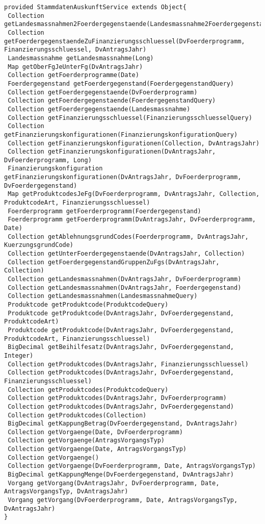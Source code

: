\begin{lstlisting}[style = dsl, caption = Deklaration von StammdatenAuskunftService, captionpos = b, label = lst_std]
provided StammdatenAuskunftService extends Object{
 Collection getLandesmassnahmen2Foerdergegenstaende(Landesmassnahme2FoerdergegenstandQuery)
 Collection getFoerdergegenstaendeZuFinanzierungsschluessel(DvFoerderprogramm, Finanzierungsschluessel, DvAntragsJahr)
 Landesmassnahme getLandesmassnahme(Long)
 Map getOberFgJeUnterFg(DvAntragsJahr)
 Collection getFoerderprogramme(Date)
 Foerdergegenstand getFoerdergegenstand(FoerdergegenstandQuery)
 Collection getFoerdergegenstaende(DvFoerderprogramm)
 Collection getFoerdergegenstaende(FoerdergegenstandQuery)
 Collection getFoerdergegenstaende(Landesmassnahme)
 Collection getFinanzierungsschluessel(FinanzierungsschluesselQuery)
 Collection getFinanzierungskonfigurationen(FinanzierungskonfigurationQuery)
 Collection getFinanzierungskonfigurationen(Collection, DvAntragsJahr)
 Collection getFinanzierungskonfigurationen(DvAntragsJahr, DvFoerderprogramm, Long)
 Finanzierungskonfiguration getFinanzierungskonfigurationen(DvAntragsJahr, DvFoerderprogramm, DvFoerdergegenstand)
 Map getProduktcodesJeFg(DvFoerderprogramm, DvAntragsJahr, Collection, ProduktcodeArt, Finanzierungsschluessel)
 Foerderprogramm getFoerderprogramm(Foerdergegenstand)
 Foerderprogramm getFoerderprogramm(DvAntragsJahr, DvFoerderprogramm, Date)
 Collection getAblehnungsgrundCodes(Foerderprogramm, DvAntragsJahr, KuerzungsgrundCode)
 Collection getUnterFoerdergegenstaende(DvAntragsJahr, Collection)
 Collection getFoerdergegenstandGruppenZuFgs(DvAntragsJahr, Collection)
 Collection getLandesmassnahmen(DvAntragsJahr, DvFoerderprogramm)
 Collection getLandesmassnahmen(DvAntragsJahr, Foerdergegenstand)
 Collection getLandesmassnahmen(LandesmassnahmeQuery)
 Produktcode getProduktcode(ProduktcodeQuery)
 Produktcode getProduktcode(DvAntragsJahr, DvFoerdergegenstand, ProduktcodeArt)
 Produktcode getProduktcode(DvAntragsJahr, DvFoerdergegenstand, ProduktcodeArt, Finanzierungsschluessel)
 BigDecimal getBeihilfesatz(DvAntragsJahr, DvFoerdergegenstand, Integer)
 Collection getProduktcodes(DvAntragsJahr, Finanzierungsschluessel)
 Collection getProduktcodes(DvAntragsJahr, DvFoerdergegenstand, Finanzierungsschluessel)
 Collection getProduktcodes(ProduktcodeQuery)
 Collection getProduktcodes(DvAntragsJahr, DvFoerderprogramm)
 Collection getProduktcodes(DvAntragsJahr, DvFoerdergegenstand)
 Collection getProduktcodes(Collection)
 BigDecimal getKappungBetrag(DvFoerdergegenstand, DvAntragsJahr)
 Collection getVorgaenge(Date, DvFoerderprogramm)
 Collection getVorgaenge(AntragsVorgangsTyp)
 Collection getVorgaenge(Date, AntragsVorgangsTyp)
 Collection getVorgaenge()
 Collection getVorgaenge(DvFoerderprogramm, Date, AntragsVorgangsTyp)
 BigDecimal getKappungMenge(DvFoerdergegenstand, DvAntragsJahr)
 Vorgang getVorgang(DvAntragsJahr, DvFoerderprogramm, Date, AntragsVorgangsTyp, DvAntragsJahr)
 Vorgang getVorgang(DvFoerderprogramm, Date, AntragsVorgangsTyp, DvAntragsJahr)
}
\end{lstlisting}
